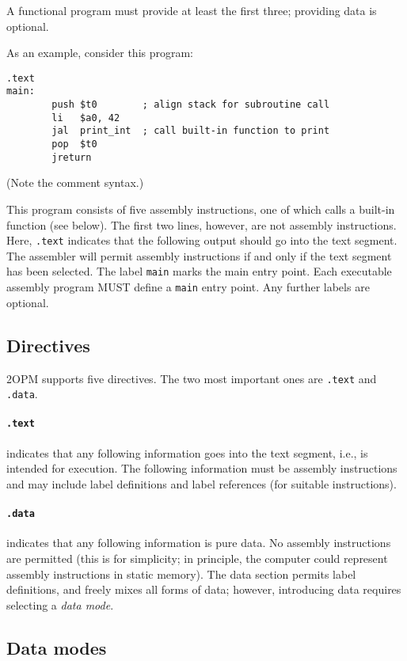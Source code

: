 \documentclass{article}
\begin{document}
A functional program must provide at least the first three; providing
data is optional.

As an example, consider this program:

\begin{lstlisting}
.text
main:
        push $t0        ; align stack for subroutine call
        li   $a0, 42
        jal  print_int  ; call built-in function to print
        pop  $t0
        jreturn
\end{lstlisting}
(Note the comment syntax.)

This program consists of five assembly instructions, one of which
calls a built-in function (see below).  The first two lines, however,
are not assembly instructions.  Here, \texttt{.text} indicates that
the following output should go into the text segment.  The assembler
will permit assembly instructions if and only if the text segment has
been selected.  The label \texttt{main} marks the main entry point.
Each executable assembly program MUST define a \texttt{main} entry
point.  Any further labels are optional.

\subsection{Directives}

2OPM supports five directives.  The two most important ones are \texttt{.text} and \texttt{.data}.

\paragraph{\texttt{.text}} indicates that any following information goes into the text segment, 
i.e., is intended for execution.  The following information must be assembly instructions
and may include label definitions and label references (for suitable instructions).

\paragraph{\texttt{.data}} indicates  that any following information is pure data.  No 
assembly instructions are permitted (this is for simplicity; in principle, the
computer could represent assembly instructions in static memory).  The data section 
permits label definitions, and
freely
mixes all forms of data; however, introducing data requires selecting a \emph{data mode}.

\subsection{Data modes}
\end{document}
